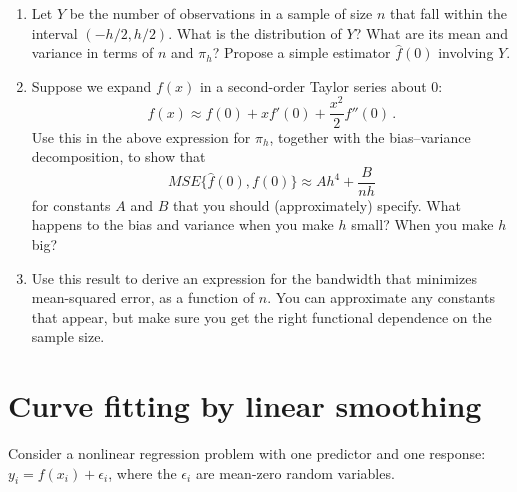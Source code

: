 \documentclass{homework}
\newcommand{\1}{\mathbf{1}}
\begin{document}
\begin{enumerate}[label=(\Alph*)]
\item Let $Y$ be the number of observations in a sample of size $n$ that fall within the interval $(-h/2, h/2)$.  What is the distribution of $Y$?  What are its mean and variance in terms of $n$ and $\pi_h$?  Propose a simple estimator $\hat{f}(0)$ involving $Y$.
\item Suppose we expand $f(x)$ in a second-order Taylor series about $0$:
$$
f(x) \approx f(0) + x f'(0) + \frac{x^2}{2} f''(0) \, .
$$
Use this in the above expression for $\pi_h$, together with the bias--variance decomposition, to show that
$$
MSE\{ \hat{f}(0), f(0) \} \approx A h^4 + \frac{B}{nh}
$$
for constants $A$ and $B$ that you should (approximately) specify.  What happens to the bias and variance when you make $h$ small?  When you make $h$ big?

\item Use this result to derive an expression for the bandwidth that minimizes mean-squared error, as a function of $n$.  You can approximate any constants that appear, but make sure you get the right functional dependence on the sample size.

\end{enumerate}


%


\section{Curve fitting by linear smoothing}

Consider a nonlinear regression problem with one predictor and one response: $y_i = f(x_i) + \epsilon_i$, where the $\epsilon_i$ are mean-zero random variables.
\end{document}
